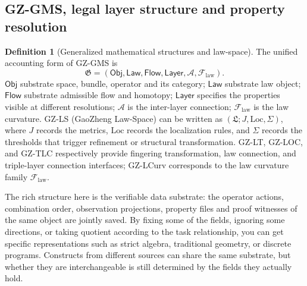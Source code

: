 \documentclass[11pt,a4paper]{article}
\theoremstyle{plain}
\theoremstyle{definition}
\newtheorem{definition}[theorem]{Definition}
\theoremstyle{remark}
\begin{document}
\begin{CJK*}
\subsection { GZ-GMS, legal layer structure and property resolution }

\begin{definition}
[Generalized mathematical structures and law-space]\label{fa:def-gms}
The unified accounting form of GZ-GMS is \[
 \mathfrak G=(\mathsf{Obj},\mathsf{Law},\mathsf{Flow},
 \mathsf{Layer},\mathcal A,\mathcal F_{\mathrm{law}}).
\] $\mathsf{Obj}$ substrate space, bundle, operator and its category; $\mathsf{Law}$ substrate law object; $\mathsf{Flow}$ substrate admissible flow and homotopy; $\mathsf{Layer}$ specifies the properties visible at different resolutions; $\mathcal A$ is the inter-layer connection; $\mathcal F_{\mathrm{law}}$ is the law curvature. GZ-LS (GaoZheng Law-Space) can be written as $(\mathfrak L;J,\mathrm{Loc},\Sigma)$, where $J$ records the metrics, $\mathrm{Loc}$ records the localization rules, and $\Sigma$ records the thresholds that trigger refinement or structural transformation. GZ-LT, GZ-LOC, and GZ-TLC respectively provide fingering transformation, law connection, and triple-layer connection interfaces; GZ-LCurv corresponds to the law curvature family $\mathcal F_{\mathrm{law}}$.\end{definition}


The rich structure here is the verifiable data substrate: the operator actions, combination order, observation projections, property files and proof witnesses of the same object are jointly saved. By fixing some of the fields, ignoring some directions, or taking quotient according to the task relationship, you can get specific representations such as strict algebra, traditional geometry, or discrete programs. Constructs from different sources can share the same substrate, but whether they are interchangeable is still determined by the fields they actually hold. \cite{S01,S09,S10}


\end{CJK*}
\end{document}

